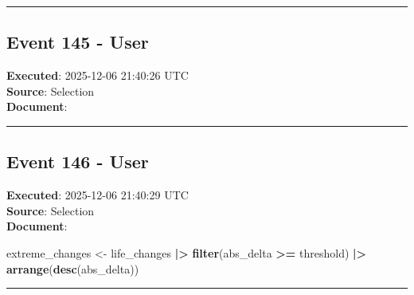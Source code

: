 \documentclass[
  11pt,
]{article}
\newenvironment{Shaded}{\begin{snugshade}}{\end{snugshade}}
\newcommand{\AttributeTok}[1]{\textcolor[rgb]{0.13,0.29,0.53}{#1}}
\newcommand{\CommentTok}[1]{\textcolor[rgb]{0.56,0.35,0.01}{\textit{#1}}}
\newcommand{\ConstantTok}[1]{\textcolor[rgb]{0.56,0.35,0.01}{#1}}
\newcommand{\FloatTok}[1]{\textcolor[rgb]{0.00,0.00,0.81}{#1}}
\newcommand{\FunctionTok}[1]{\textcolor[rgb]{0.13,0.29,0.53}{\textbf{#1}}}
\newcommand{\NormalTok}[1]{#1}
\newcommand{\OtherTok}[1]{\textcolor[rgb]{0.56,0.35,0.01}{#1}}
\newcommand{\SpecialCharTok}[1]{\textcolor[rgb]{0.81,0.36,0.00}{\textbf{#1}}}
\begin{document}
\begin{center}\rule{0.5\linewidth}{0.5pt}\end{center}

\subsection{Event 145 - User}\label{event-145---user}

\textbf{Executed}: 2025-12-06 21:40:26 UTC\\
\textbf{Source}: Selection\\
\textbf{Document}:

\begin{Shaded}
\end{Shaded}

\begin{center}\rule{0.5\linewidth}{0.5pt}\end{center}

\subsection{Event 146 - User}\label{event-146---user}

\textbf{Executed}: 2025-12-06 21:40:29 UTC\\
\textbf{Source}: Selection\\
\textbf{Document}:

\begin{Shaded}
\begin{Highlighting}[]
\NormalTok{extreme\_changes }\OtherTok{\textless{}{-}}\NormalTok{ life\_changes }\SpecialCharTok{|\textgreater{}}
  \FunctionTok{filter}\NormalTok{(abs\_delta }\SpecialCharTok{\textgreater{}=}\NormalTok{ threshold) }\SpecialCharTok{|\textgreater{}}
  \FunctionTok{arrange}\NormalTok{(}\FunctionTok{desc}\NormalTok{(abs\_delta))}
\end{Highlighting}
\end{Shaded}

\begin{center}\rule{0.5\linewidth}{0.5pt}\end{center}
\end{document}
